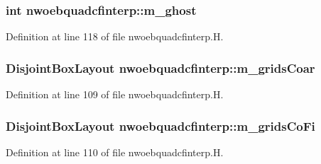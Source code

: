 \subsubsection[{\texorpdfstring{m\+\_\+ghost}{m_ghost}}]{\setlength{\rightskip}{0pt plus 5cm}int nwoebquadcfinterp\+::m\+\_\+ghost\hspace{0.3cm}{\ttfamily [protected]}}\hypertarget{classnwoebquadcfinterp_aa7bee9c12e43c2d6c435b6be497c1b22}{}\label{classnwoebquadcfinterp_aa7bee9c12e43c2d6c435b6be497c1b22}


Definition at line 118 of file nwoebquadcfinterp.\+H.

\subsubsection[{\texorpdfstring{m\+\_\+grids\+Coar}{m_gridsCoar}}]{\setlength{\rightskip}{0pt plus 5cm}Disjoint\+Box\+Layout nwoebquadcfinterp\+::m\+\_\+grids\+Coar\hspace{0.3cm}{\ttfamily [protected]}}\hypertarget{classnwoebquadcfinterp_a48916b7af00c345229f5c41b5382c91f}{}\label{classnwoebquadcfinterp_a48916b7af00c345229f5c41b5382c91f}


Definition at line 109 of file nwoebquadcfinterp.\+H.

\subsubsection[{\texorpdfstring{m\+\_\+grids\+Co\+Fi}{m_gridsCoFi}}]{\setlength{\rightskip}{0pt plus 5cm}Disjoint\+Box\+Layout nwoebquadcfinterp\+::m\+\_\+grids\+Co\+Fi\hspace{0.3cm}{\ttfamily [protected]}}\hypertarget{classnwoebquadcfinterp_aab63ef9fc22a60ffecb74f7f916e2422}{}\label{classnwoebquadcfinterp_aab63ef9fc22a60ffecb74f7f916e2422}


Definition at line 110 of file nwoebquadcfinterp.\+H.

